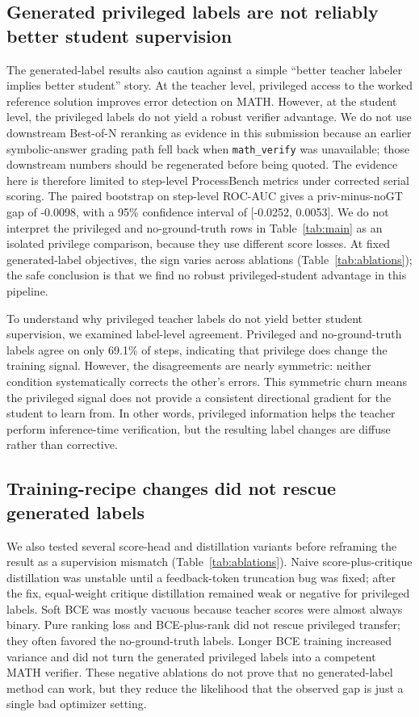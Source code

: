 \documentclass{article}
\begin{document}
\subsection{Generated privileged labels are not reliably better student supervision}

The generated-label results also caution against a simple ``better teacher labeler implies better student'' story.
At the teacher level, privileged access to the worked reference solution improves error detection on MATH.
However, at the student level, the privileged labels do not yield a robust verifier advantage.
We do not use downstream Best-of-N reranking as evidence in this submission because an earlier symbolic-answer grading path fell back when \texttt{math\_verify} was unavailable; those downstream numbers should be regenerated before being quoted.
The evidence here is therefore limited to step-level ProcessBench metrics under corrected serial scoring.
The paired bootstrap on step-level ROC-AUC gives a priv-minus-noGT gap of -0.0098, with a 95\% confidence interval of [-0.0252, 0.0053].
We do not interpret the privileged and no-ground-truth rows in Table~\ref{tab:main} as an isolated privilege comparison, because they use different score losses.
At fixed generated-label objectives, the sign varies across ablations (Table~\ref{tab:ablations}); the safe conclusion is that we find no robust privileged-student advantage in this pipeline.

To understand why privileged teacher labels do not yield better student supervision, we examined label-level agreement.
Privileged and no-ground-truth labels agree on only 69.1\% of steps, indicating that privilege does change the training signal.
However, the disagreements are nearly symmetric: neither condition systematically corrects the other's errors.
This symmetric churn means the privileged signal does not provide a consistent directional gradient for the student to learn from.
In other words, privileged information helps the teacher perform inference-time verification, but the resulting label changes are diffuse rather than corrective.

\subsection{Training-recipe changes did not rescue generated labels}

We also tested several score-head and distillation variants before reframing the result as a supervision mismatch (Table~\ref{tab:ablations}).
Naive score-plus-critique distillation was unstable until a feedback-token truncation bug was fixed; after the fix, equal-weight critique distillation remained weak or negative for privileged labels.
Soft BCE was mostly vacuous because teacher scores were almost always binary.
Pure ranking loss and BCE-plus-rank did not rescue privileged transfer; they often favored the no-ground-truth labels.
Longer BCE training increased variance and did not turn the generated privileged labels into a competent MATH verifier.
These negative ablations do not prove that no generated-label method can work, but they reduce the likelihood that the observed gap is just a single bad optimizer setting.
\end{document}
